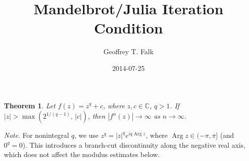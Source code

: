 \documentclass[11pt]{article}
\date{2014-07-25}
\author{Geoffrey T. Falk}
\title{Mandelbrot/Julia Iteration Condition}
\begin{document}

\maketitle

\newtheorem*{theorem}{Theorem}

\begin{theorem}
Let \( f(z) = z^q + c \), where \( z, c \in \mathbb{C} \), \( q > 1 \).
If \( |z| > \max\left(2^{1/(q-1)},\, |c|\right) \), then
\( |f^n(z)| \rightarrow \infty \) as \( n \rightarrow \infty \).
\end{theorem}

\noindent\emph{Note.} For nonintegral \( q \), we use
\( z^q = |z|^q e^{i q \operatorname{Arg} z} \), where
\( \operatorname{Arg} z \in (-\pi,\pi] \) (and \( 0^q = 0 \)).
This introduces a branch-cut discontinuity along the negative real axis,
which does not affect the modulus estimates below.
\end{document}
